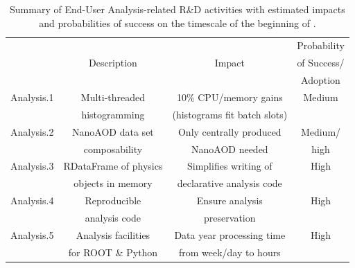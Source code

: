 \begin{table}[tbph]
    \centering
    \caption{Summary of End-User Analysis-related R\&D activities with estimated impacts and probabilities of success on the timescale of the beginning of \RunFour.}
    \begin{tabular}{|c|c|c|c|}
    \hline
    \rowcolor{tableheader} 
                               &                                    &                                & Probability         \\ 
    \rowcolor{tableheader}
                               & Description                        &       Impact                   & of Success/         \\ 
    \rowcolor{tableheader}
                               &                                    &                                & Adoption            \\ \hline
    \cellcolor{tablerowheader}
Analysis.1                     & Multi-threaded                     &  10\% CPU/memory gains   &    Medium           \\  
    \cellcolor{tablerowheader}
                               &  histogramming                     &  (histograms fit batch slots)  &                     \\ \hline
    \cellcolor{tablerowheader}
Analysis.2                     &  NanoAOD data set                   & Only centrally produced        &    Medium/          \\
    \cellcolor{tablerowheader}
                               &  composability                     & NanoAOD needed                 &               high  \\ \hline
    \cellcolor{tablerowheader}
Analysis.3                     & RDataFrame of physics              & Simplifies writing of          &    High             \\
    \cellcolor{tablerowheader}
                               & objects in memory                  & declarative analysis code      &                     \\ \hline
    \cellcolor{tablerowheader}
Analysis.4                     & Reproducible                       & Ensure analysis                &    High             \\
    \cellcolor{tablerowheader}
                               & analysis code                      & preservation                   &                     \\ \hline
    \cellcolor{tablerowheader}
Analysis.5                     & Analysis facilities                & Data year processing time      &    High             \\
    \cellcolor{tablerowheader}
                               & for \textsc{ROOT} \& Python  & from week/day to hours         &                     \\ \hline
    \end{tabular}
    \label{tab:analysis-improvements}
\end{table}
\clearpage



